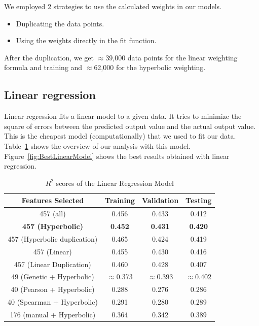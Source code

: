 \documentclass[11pt]{article}
\begin{document}
We employed 2 strategies to use the calculated weights in our models.

\begin{itemize}
\item Duplicating the data points.
\item Using the weights directly in the fit function.
\end{itemize}

After the duplication, we get $\approx$39,000 data points for the linear weighting formula and training and  $\approx$62,000 for the hyperbolic weighting.

\subsection{Linear regression}
Linear regression fits a linear model to a given data.
It tries to minimize the square of errors between the predicted output value and the actual output value.
This is the cheapest model (computationally) that we used to fit our data.
Table~\ref{table:1} shows the overview of our analysis with this model.
Figure~\ref{fig:BestLinearModel} shows the best results obtained with linear regression.

\begin{table} [h!]
\centering
 \begin{tabular}{ | c | c | c | c | }
\hline
\textbf{Features Selected} & \textbf{Training} & \textbf{Validation} & \textbf{Testing} \\ [0.5 ex]
\hline \hline
457 (all) & 0.456 & 0.433 & 0.412\\
\textbf{457 (Hyperbolic)} & \textbf{0.452} & \textbf{0.431} & \textbf{0.420}\\
457 (Hyperbolic duplication) & 0.465 & 0.424 & 0.419\\
457 (Linear) & 0.455 & 0.430 & 0.416\\
457 (Linear Duplication) & 0.460 & 0.428 & 0.407\\
49 (Genetic + Hyperbolic)\footnotemark[1] & $\approx$0.373 & $\approx$0.393  & $\approx$0.402\\
40 (Pearson + Hyperbolic) & 0.288 & 0.276  & 0.286 \\ 
40 (Spearman + Hyperbolic) & 0.291 & 0.280  & 0.289 \\ 
176 (manual + Hyperbolic) & 0.364  & 0.342  & 0.389\\ [1ex]
\hline
\end{tabular}
\caption{$R^2$ scores of the Linear Regression Model}
\label {table:1}
\end{table}
\end{document}
